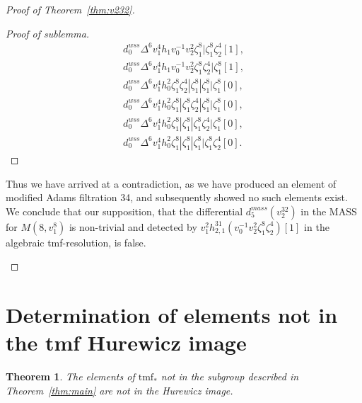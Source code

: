 \documentclass[10pt]{amsart}
\newcommand{\tmf}{\mathrm{tmf}}
\newtheorem{thm}[equation]{Theorem}
\theoremstyle{definition}
\numberwithin{equation}{section}
\numberwithin{figure}{section}
\begin{document}
\begin{proof}[Proof of Theorem~\ref{thm:v232}]
\begin{description}
\begin{proof}[Proof of sublemma]
\begin{equation*}
\begin{split}
d_0^{wss}\Delta^6 v_1^4 h_1 v_0^{-1}v_2^2\zeta_1^8|\zeta_1^8\zeta_2^4[1], \\
d_0^{wss}\Delta^6 v_1^4 h_1 v_0^{-1}v_2^2\zeta_1^8\zeta_2^4|\zeta_1^8[1], \\
d_0^{wss}\Delta^6 v_1^4 h_0^2
\zeta_1^8\zeta_2^4|\zeta_1^8|\zeta_1^8|\zeta_1^8[0], \\
d_0^{wss}\Delta^6 v_1^4 h_0^2 \zeta_1^8|\zeta_1^8\zeta_2^4|\zeta_1^8|\zeta_1^8[0], \\
d_0^{wss}\Delta^6 v_1^4 h_0^2 \zeta_1^8|\zeta_1^8|\zeta_1^8\zeta_2^4|\zeta_1^8[0], \\
d_0^{wss}\Delta^6 v_1^4 h_0^2 \zeta_1^8|\zeta_1^8|\zeta_1^8|\zeta_1^8\zeta_2^4[0].
\end{split}
\end{equation*}
\end{proof}
Thus we have arrived at a contradiction, as we have produced an element of modified Adams filtration 34, and subsequently showed no such elements exist. We conclude that our supposition, that the differential $d_5^{mass}(v^{32}_2)$ in the MASS for $M(8,v_1^8)$ is non-trivial and detected by $v_1^2 h_{2,1}^{31}(v_0^{-1}v_2^2\zeta_1^8\zeta_2^4)[1]$ in the algebraic tmf-resolution, is false. 

\end{description}
\end{proof}



\section{Determination of elements not in the tmf Hurewicz image}\label{sec:J}

\begin{thm}\label{thm:nothi}
The elements of $\tmf_*$ not in the subgroup described in Theorem~\ref{thm:main} are not in the Hurewicz image.
\end{thm}
\end{document}
